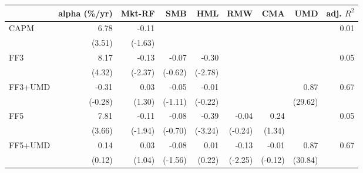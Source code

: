 \begin{tabular}{lrrrrrrrr}
\toprule
 & alpha (\%/yr) & Mkt-RF & SMB & HML & RMW & CMA & UMD & adj. $R^2$ \\
\midrule
CAPM & 6.78 & -0.11 &  &  &  &  &  & 0.01 \\
 & (3.51) & (-1.63) &  &  &  &  &  &  \\[2pt]
FF3 & 8.17 & -0.13 & -0.07 & -0.30 &  &  &  & 0.05 \\
 & (4.32) & (-2.37) & (-0.62) & (-2.78) &  &  &  &  \\[2pt]
FF3+UMD & -0.31 & 0.03 & -0.05 & -0.01 &  &  & 0.87 & 0.67 \\
 & (-0.28) & (1.30) & (-1.11) & (-0.22) &  &  & (29.62) &  \\[2pt]
FF5 & 7.81 & -0.11 & -0.08 & -0.39 & -0.04 & 0.24 &  & 0.05 \\
 & (3.66) & (-1.94) & (-0.70) & (-3.24) & (-0.24) & (1.34) &  &  \\[2pt]
FF5+UMD & 0.14 & 0.03 & -0.08 & 0.01 & -0.13 & -0.01 & 0.87 & 0.67 \\
 & (0.12) & (1.04) & (-1.56) & (0.22) & (-2.25) & (-0.12) & (30.84) &  \\[2pt]
\bottomrule
\end{tabular}
